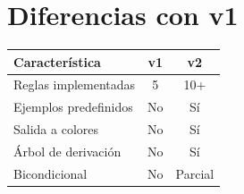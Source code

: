 \documentclass[12pt,a4paper]{article}
\begin{document}
\section{Diferencias con v1}

\begin{center}
\begin{tabular}{|l|c|c|}
\hline
\textbf{Característica} & \textbf{v1} & \textbf{v2} \\
\hline
Reglas implementadas & 5 & 10+ \\
Ejemplos predefinidos & No & Sí \\
Salida a colores & No & Sí \\
Árbol de derivación & No & Sí \\
Bicondicional & No & Parcial \\
\hline
\end{tabular}
\end{center}
\end{document}
